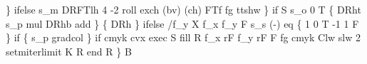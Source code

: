 \documentclass[11pt]{article}
\begin{document}
        \} ifelse  %
        s_m       %
        DRFTlh    %
        4 -2 roll %
        exch      %
        (bv) (ch) %
        FTf       %
        fg        %
        ttshw     %
      \} if        %
      S           %
        s_o 0 T   %
        \{          %
          DRht     %
          s_p mul  %
          DRhb add %
        \} \{        %
          DRh      %
        \} ifelse   %
        /f_y X    %
        f_x       %
        f_y       %
          F       %
        s_s (-) eq \{  %
           1 0 T      %
          -1 1 F      %
        \} if          %
        \{             %
          s_p gradcol %
        \} if          %
        cmyk      %
        cvx       %
        exec      %
        S fill R  %
        f_x rF    %
        f_y rF    %
             F    %
        fg cmyk   %
        Clw slw   %
        2 setmiterlimit %
        K         %
      R           %
    end           %
  R               %
\} B               %
\eatline
\end{document}
